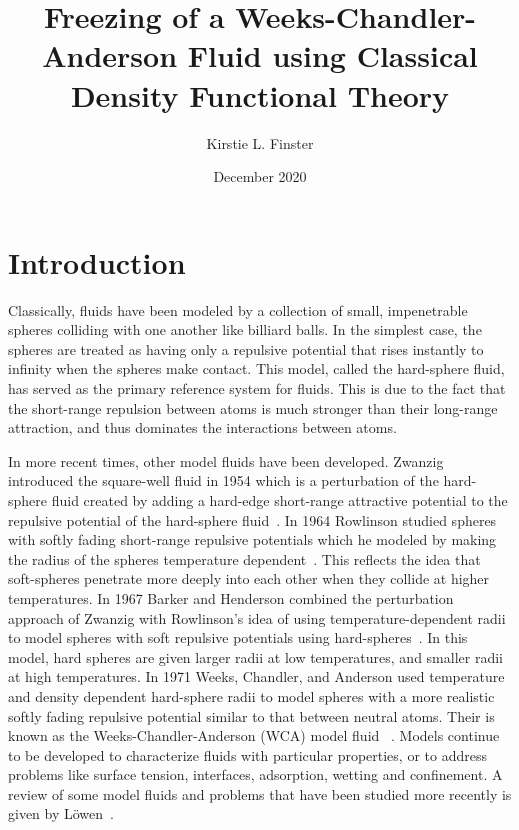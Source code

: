 \documentclass[double,12pt]{beavtex}
\title{Freezing of a Weeks-Chandler-Anderson Fluid using Classical Density Functional Theory}
\author{Kirstie L. Finster}
\date{December 2020}
\begin{document}
   \maketitle
   \mainmatter

\chapter{Introduction}

Classically, fluids have been modeled by a collection of small, 
impenetrable spheres colliding with one another like billiard balls. 
In the simplest case, the spheres are treated as having only a repulsive 
potential that rises instantly to infinity when the spheres make contact. 
This model, called the hard-sphere fluid, has served as the 
primary reference system for fluids. This is due to the fact that the 
short-range repulsion between atoms is much stronger than their long-range 
attraction, and thus dominates the interactions between atoms. 

In more recent times, other model fluids have been developed.
Zwanzig introduced the square-well 
fluid in 1954 which is a perturbation of the hard-sphere fluid created by adding 
a hard-edge short-range attractive potential to the repulsive potential of the 
hard-sphere fluid~\cite{ZwanzigSqrWell}. In 1964 Rowlinson studied 
spheres with softly fading short-range repulsive potentials which he modeled by making
the radius of the spheres temperature dependent~\cite{rowlinson1964statistical}. 
This reflects the idea that soft-spheres penetrate more deeply into 
each other when they collide at higher temperatures. 
In 1967 Barker and Henderson combined the perturbation approach of Zwanzig 
with Rowlinson's idea of using temperature-dependent radii to model spheres 
with soft repulsive potentials using hard-spheres~\cite{barker1967perturbation}. 
In this model, 
hard spheres are given larger radii 
at low temperatures, and smaller radii at high temperatures. 
In 1971 Weeks, 
Chandler, and Anderson used temperature and density dependent hard-sphere 
radii to model spheres with a more realistic softly fading repulsive 
potential similar to that between neutral atoms.
Their is known as the Weeks-Chandler-Anderson (WCA) model fluid~\cite{andersen1971relationship} . 
Models continue to be developed to characterize fluids with particular 
properties, or to address problems like surface tension, 
interfaces, adsorption, wetting and confinement.
A review of some model fluids and problems that have been
studied more recently is given by L\"{o}wen~\cite{lowen}.
\end{document}
